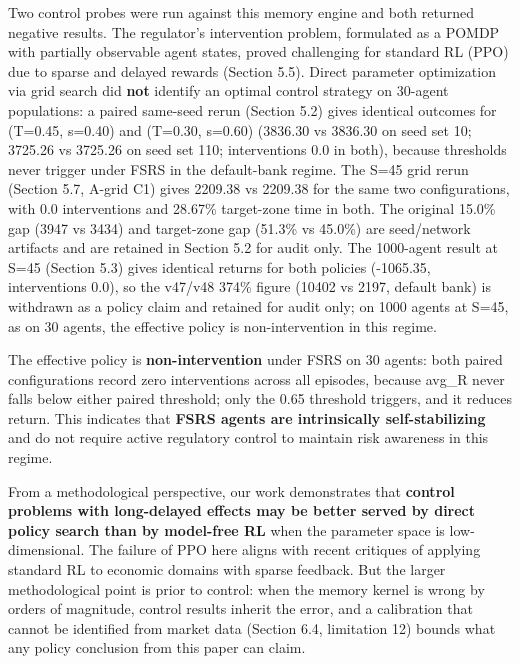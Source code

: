 \documentclass[11pt]{article}
\begin{document}
Two control probes were run against this memory engine and both returned negative results. The regulator's intervention problem, formulated as a POMDP with partially observable agent states, proved challenging for standard RL (PPO) due to sparse and delayed rewards (Section 5.5). Direct parameter optimization via grid search did \textbf{not} identify an optimal control strategy on 30-agent populations: a paired same-seed rerun (Section 5.2) gives identical outcomes for (T=0.45, s=0.40) and (T=0.30, s=0.60) (3836.30 vs 3836.30 on seed set 10; 3725.26 vs 3725.26 on seed set 110; interventions 0.0 in both), because thresholds never trigger under FSRS in the default-bank regime. The S=45 grid rerun (Section 5.7, A-grid C1) gives 2209.38 vs 2209.38 for the same two configurations, with 0.0 interventions and 28.67\% target-zone time in both. The original 15.0\% gap (3947 vs 3434) and target-zone gap (51.3\% vs 45.0\%) are seed/network artifacts and are retained in Section 5.2 for audit only. The 1000-agent result at S=45 (Section 5.3) gives identical returns for both policies (-1065.35, interventions 0.0), so the v47/v48 374\% figure (10402 vs 2197, default bank) is withdrawn as a policy claim and retained for audit only; on 1000 agents at S=45, as on 30 agents, the effective policy is non-intervention in this regime.

The effective policy is \textbf{non-intervention} under FSRS on 30 agents: both paired configurations record zero interventions across all episodes, because avg\_R never falls below either paired threshold; only the 0.65 threshold triggers, and it reduces return. This indicates that \textbf{FSRS agents are intrinsically self-stabilizing} and do not require active regulatory control to maintain risk awareness in this regime.

From a methodological perspective, our work demonstrates that \textbf{control problems with long-delayed effects may be better served by direct policy search than by model-free RL} when the parameter space is low-dimensional. The failure of PPO here aligns with recent critiques of applying standard RL to economic domains with sparse feedback. But the larger methodological point is prior to control: when the memory kernel is wrong by orders of magnitude, control results inherit the error, and a calibration that cannot be identified from market data (Section 6.4, limitation 12) bounds what any policy conclusion from this paper can claim.
\end{document}
